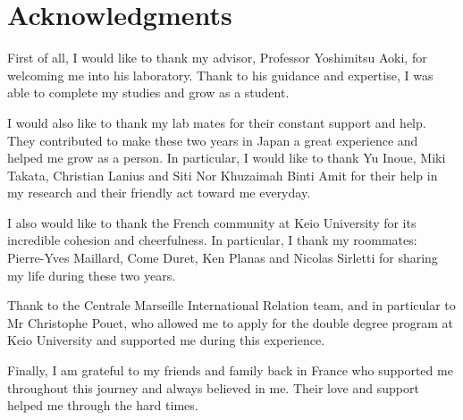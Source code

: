 \chapter*{Acknowledgments}
First of all, I would like to thank my advisor, Professor Yoshimitsu Aoki, for welcoming me into his laboratory. Thank to his guidance and expertise, I was able to complete my studies and grow as a student.

I would also like to thank my lab mates for their constant support and help. They contributed to make these two years in Japan a great experience and helped me grow as a person. In particular, I would like to thank Yu Inoue, Miki Takata, Christian Lanius and Siti Nor Khuzaimah Binti Amit for their help in my research and their friendly act toward me everyday.

I also would like to thank the French community at Keio University for its incredible cohesion and cheerfulness. In particular, I thank my roommates: Pierre-Yves Maillard, Come Duret, Ken Planas and Nicolas Sirletti for sharing my life during these two years.

Thank to the Centrale Marseille International Relation team, and in particular to Mr Christophe Pouet, who allowed me to apply for the double degree program at Keio University and supported me during this experience.

Finally, I am grateful to my friends and family back in France who supported me throughout this journey and always believed in me. Their love and support helped me through the hard times.